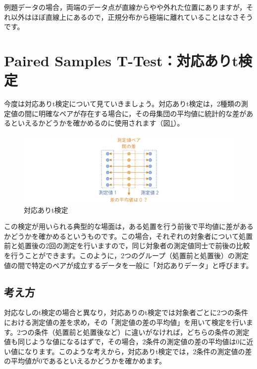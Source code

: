\documentclass[
  12pt,
  a5jpaper,
  lualatex, ja=standard]{bxjsbook}
\begin{document}
例題データの場合，両端のデータ点が直線からやや外れた位置にありますが，それ以外はほぼ直線上にあるので，正規分布から極端に離れていることはなさそうです。

\hypertarget{sec:ttests-paired}{%
\section{Paired Samples T-Test：対応ありt検定}\label{sec:ttests-paired}}

今度は対応ありt検定について見ていきましょう。対応ありt検定は，2種類の測定値の間に明確なペアが存在する場合に，その母集団の平均値に統計的な差があるといえるかどうかを確かめるのに使用されます（図\ref{fig:ttests-paired-t}）。

\begin{figure}[!ht]

{\centering \includegraphics[width=1\linewidth]{images/ttests/paired-t} 

}

\caption{対応ありt検定}\label{fig:ttests-paired-t}
\end{figure}

この検定が用いられる典型的な場面は，ある処置を行う前後で平均値に差があるかどうかを確かめるというものです。この場合，それぞれの対象者について処置前と処置後の2回の測定を行いますので，同じ対象者の測定値同士で前後の比較を行うことができます。このように，2つのグループ（処置前と処置後）の測定値の間で特定のペアが成立するデータを一般に「対応ありデータ」と呼びます。

\hypertarget{subsec:ttests-paired-basics}{%
\subsection{考え方}\label{subsec:ttests-paired-basics}}

対応なしのt検定の場合と異なり，対応ありのt検定では対象者ごとに2つの条件における測定値の差を求め，その「測定値の差の平均値」を用いて検定を行います。2つの条件（処置前と処置後など）に違いがなければ，どちらの条件の測定値も同じような値になるはずで，その場合，2条件の測定値の差の平均値は0に近い値になります。このような考えから，対応ありt検定では，2条件の測定値の差の平均値が0であるといえるかどうかを確かめます。
\end{document}
